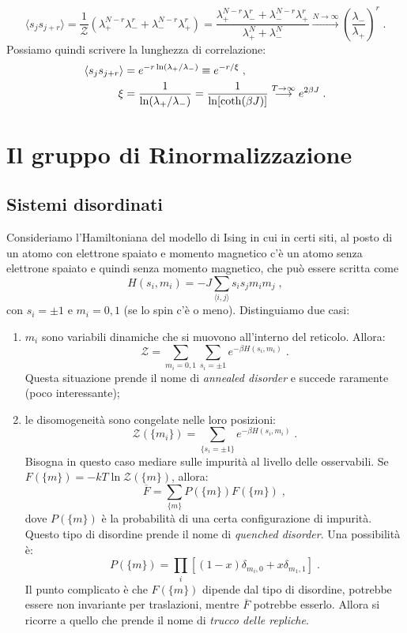 \documentclass[10pt,a4paper]{report}
\theoremstyle{definition}
\numberwithin{equation}{section}
\newcommand{\bra}{\langle}
\newcommand{\ket}{\rangle}
\newcommand{\zpart}{\mathcal{Z}}
\begin{document}
\begin{equation}
\bra s_js_{j+r}\ket =\frac{1}{\zpart}(\lambda_+^{N-r}\lambda_-^r+\lambda_-^{N-r}\lambda_+^r)=\frac{\lambda_+^{N-r}\lambda_-^r+\lambda_-^{N-r}\lambda_+^r}{\lambda_+^N+\lambda_-^N}\stackrel{N\to\infty}{\longrightarrow}\left(\frac{\lambda_-}{\lambda_+}\right)^r\;.
\end{equation}
Possiamo quindi scrivere la lunghezza di correlazione:
\begin{align}
\bra s_js_{j+r}\ket &=e^{-r\ln(\lambda_+/\lambda_-)}\equiv e^{-r/\xi}\;, \notag \\
\xi &= \frac{1}{\ln(\lambda_+/\lambda_-)}=\frac{1}{\ln[\coth(\beta J)]}\stackrel{T\to\infty}{\longrightarrow} e^{2\beta J}\;.
\end{align}
\chapter{Il gruppo di Rinormalizzazione}
\section{Sistemi disordinati}
Consideriamo l'Hamiltoniana del modello di Ising in cui in certi siti, al posto di un atomo con elettrone spaiato e momento magnetico c'è un atomo senza elettrone spaiato e quindi senza momento magnetico, che può essere scritta come
\begin{equation}
H(s_i,m_i)=-J\sum_{\bra i,j\ket}s_is_jm_im_j\;,
\end{equation}
con $s_i=\pm 1$ e $m_i=0,1$ (se lo spin c'è o meno). Distinguiamo due casi:
\begin{enumerate}
\item $m_i$ sono variabili dinamiche che si muovono all'interno del reticolo. Allora:
\begin{equation}
\zpart=\sum_{m_i=0,1}\sum_{s_i=\pm 1}e^{-\beta H(s_i,m_i)}\;.
\end{equation}
Questa situazione prende il nome di \emph{annealed disorder} e succede raramente (poco interessante);
\item le disomogeneità sono congelate nelle loro posizioni:
\begin{equation}
\zpart(\{m_i\})=\sum_{\{s_i=\pm 1\}}e^{-\beta H(s_i,m_i)}\;.
\end{equation}
Bisogna in questo caso mediare sulle impurità al livello delle osservabili. Se $F(\{m\})=-kT\ln\zpart(\{m\})$, allora:
\begin{equation}
\overline{F}=\sum_{\{m\}}P(\{m\})F(\{m\})\;,
\end{equation}
dove $P(\{m\})$ è la probabilità di una certa configurazione di impurità. Questo tipo di disordine prende il nome di \emph{quenched disorder}. Una possibilità è:
\begin{equation}
P(\{m\})=\prod_i[(1-x)\delta_{m_i,0}+x\delta_{m_1,1}]\;.
\end{equation}
Il punto complicato è che  $F(\{m\})$ dipende dal tipo di disordine, potrebbe essere non invariante per traslazioni, mentre $\overline{F}$ potrebbe esserlo. Allora si ricorre a quello che prende il nome di \emph{trucco delle repliche}.
\end{enumerate}
\end{document}
